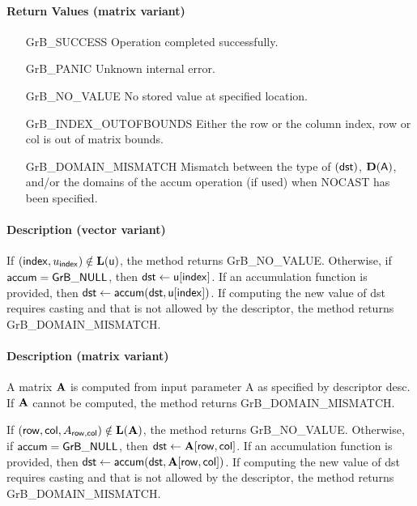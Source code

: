 \paragraph{Return Values (matrix variant)}

\begin{itemize}[leftmargin=2.1in]
\item[{\sf GrB\_SUCCESS}]          Operation completed successfully.
\item[{\sf GrB\_PANIC}]            Unknown internal error.
\item[{\sf GrB\_NO\_VALUE}]        No stored value at specified location.
\item[{\sf GrB\_INDEX\_OUTOFBOUNDS}]  Either the row or the column index,
                                      {\sf row} or {\sf col} is out of matrix bounds.
\item[{\sf GrB\_DOMAIN\_MISMATCH}]    Mismatch between the type of $(\sf dst)$, 
                                      $\bold{D}({\sf A})$, and/or the domains of the 
                                      {\sf accum} operation (if used) when {\sf NOCAST} has
                                      been specified.
\end{itemize}

\paragraph{Description (vector variant)}

If $({\sf index},u_{\sf index}) \notin \bold{L}({\sf u})$, the method returns {\sf GrB\_NO\_VALUE}.
Otherwise, if ${\sf accum} = {\sf GrB\_NULL}$, then ${\sf dst} \leftarrow {\sf u}[{\sf index}]$.
If an accumulation function is provided, then ${\sf dst} \leftarrow {\sf accum}({\sf dst},{\sf u}[{\sf index}])$.
If computing the new value of {\sf dst} requires casting and that is not allowed by the descriptor,
the method returns {\sf GrB\_DOMAIN\_MISMATCH}.

\paragraph{Description (matrix variant)}

A matrix ${\bf A}$ is computed from input parameter {\sf A} as specified by descriptor {\sf desc}.
If ${\bf A}$ cannot be computed, the method returns {\sf GrB\_DOMAIN\_MISMATCH}.

If $({\sf row},{\sf col}, A_{{\sf row},{\sf col}}) \notin \bold{L}({\bf A})$, the method returns {\sf GrB\_NO\_VALUE}.
Otherwise, if ${\sf accum} = {\sf GrB\_NULL}$, then ${\sf dst} \leftarrow {\bf A}[{\sf row},{\sf col}]$.
If an accumulation function is provided, then ${\sf dst} \leftarrow {\sf accum}({\sf dst},{\bf A}[{\sf row},{\sf col}])$.
If computing the new value of {\sf dst} requires casting and that is not allowed by the descriptor,
the method returns {\sf GrB\_DOMAIN\_MISMATCH}.

